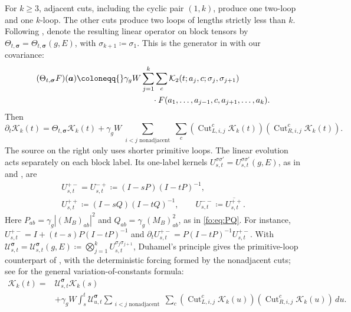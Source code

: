 \documentclass[11pt]{article}
\numberwithin{equation}{section}
\theoremstyle{remark}
\newcommand{\cK}{\mathcal K}
\begin{document}
For \(k\ge3\), adjacent cuts, including the cyclic pair \((1,k)\),
produce one two-loop and one \(k\)-loop. The other cuts produce two
loops of lengths strictly less than \(k\). Following
\cite[Definition~5.2]{YY}, denote the resulting linear operator on
block tensors by $\Theta_{t,\boldsymbol\sigma}
=\Theta_{t,\boldsymbol\sigma}(g,E)$, with
$\sigma_{k+1}\coloneqq\sigma_1$. This is the generator in
\cite[Definition~7.3, (7.18)]{TYY} with our covariance:
\begin{equation}\label{fo:eq:generator}
\begin{split}
 (\Theta_{t,\boldsymbol\sigma}F)(\boldsymbol a)
 \coloneqq {}&\gamma_g W\sum_{j=1}^k\sum_c
   \cK_2(t;a_j,c;\sigma_j,\sigma_{j+1})\\
 &\hspace{12mm}\cdot
   F(a_1,\ldots,a_{j-1},c,a_{j+1},\ldots,a_k).
 \end{split}
\end{equation}
Then
\[
 \partial_t\cK_k(t)=\Theta_{t,\boldsymbol\sigma}\cK_k(t)+
 \gamma_g W\sum_{\substack{i<j\text{ nonadjacent}}}\sum_c
       (\operatorname{Cut}_{L,i,j}^c\cK_k(t))
       (\operatorname{Cut}_{R,i,j}^c\cK_k(t)).
\]
The source on the right only uses shorter primitive loops.
The linear evolution acts separately on each block label. Its
one-label kernels $U_{s,t}^{\sigma\sigma'}=U_{s,t}^{\sigma\sigma'}(g,E)$,
as in \cite[(7.19)]{TYY} and \cite[(5.17)]{YY}, are
\begin{equation}\label{fo:eq:propagators}
 \begin{gathered}
 U_{s,t}^{+-}=U_{s,t}^{-+}\coloneqq (I-sP)(I-tP)^{-1},\\
 U_{s,t}^{++}\coloneqq (I-sQ)(I-tQ)^{-1},\qquad
 U_{s,t}^{--}\coloneqq \overline{U_{s,t}^{++}}.
 \end{gathered}
\end{equation}
Here $P_{ab}=\gamma_g|(M_B)_{ab}|^2$ and
$Q_{ab}=\gamma_g(M_B)_{ab}^2$, as in \eqref{fo:eq:PQ}.
For instance,
\(U_{s,t}^{+-}=I+(t-s)P(I-tP)^{-1}\) and
\(\partial_tU_{s,t}^{+-}=P(I-tP)^{-1}U_{s,t}^{+-}\).
With
\(\mathcal U_{s,t}^{\boldsymbol\sigma}
 =\mathcal U_{s,t}^{\boldsymbol\sigma}(g,E)\coloneqq \bigotimes_{j=1}^kU_{s,t}^{\sigma_j\sigma_{j+1}}\),
Duhamel's principle gives the primitive-loop counterpart of
\cite[(7.21)]{TYY}, with the deterministic forcing formed by the
nonadjacent cuts; see \cite[Lemma~5.3]{YY} for the general
variation-of-constants formula:
\begin{equation}\label{fo:eq:duhamel}
 \begin{split}
 \cK_k(t)={}&\mathcal U_{s,t}^{\boldsymbol\sigma}\cK_k(s)\\
 &+\gamma_g W\int_s^t\mathcal U_{u,t}^{\boldsymbol\sigma}
  \sum_{\substack{i<j\text{ nonadjacent}}}\sum_c
       (\operatorname{Cut}_{L,i,j}^c\cK_k(u))
       (\operatorname{Cut}_{R,i,j}^c\cK_k(u))\,du.
 \end{split}
\end{equation}
\end{document}
